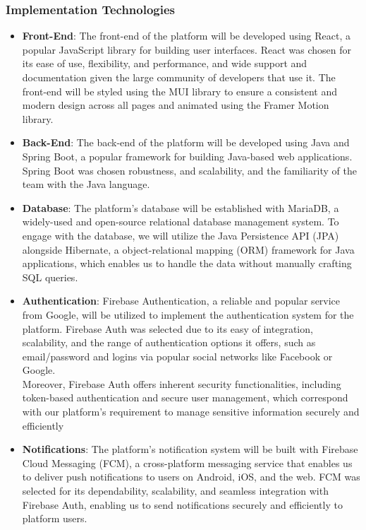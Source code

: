     \subsubsection{Implementation Technologies}
    \begin{itemize}
        \item \textbf{Front-End}: The front-end of the platform will be developed using React, a popular JavaScript library for building user interfaces. React was chosen for its ease of use, flexibility, and performance, and wide support and documentation given the large community of developers that use it. The front-end will be styled using the MUI library to ensure a consistent and modern design across all pages and animated using the Framer Motion library.
        \item \textbf{Back-End}: The back-end of the platform will be developed using Java and Spring Boot, a popular framework for building Java-based web applications. Spring Boot was chosen robustness, and scalability, and the familiarity of the team with the Java language.
        \item \textbf{Database}: The platform's database will be established with MariaDB, a widely-used and open-source relational database management system. To engage with the database, we will utilize the Java Persistence API (JPA) alongside Hibernate, a object-relational mapping (ORM) framework for Java applications, which enables us to handle the data without manually crafting SQL queries.
        \item \textbf{Authentication}: Firebase Authentication, a reliable and popular service from Google, will be utilized to implement the authentication system for the platform. Firebase Auth was selected due to its easy of integration, scalability, and the range of authentication options it offers, such as email/password and logins via popular social networks like Facebook or Google.\\
        Moreover, Firebase Auth offers inherent security functionalities, including token-based authentication and secure user management, which correspond with our platform's requirement to manage sensitive information securely and efficiently
        \item \textbf{Notifications}: The platform’s notification system will be built with Firebase Cloud Messaging (FCM), a cross-platform messaging service that enables us to deliver push notifications to users on Android, iOS, and the web. FCM was selected for its dependability, scalability, and seamless integration with Firebase Auth, enabling us to send notifications securely and efficiently to platform users.
    \end{itemize}
